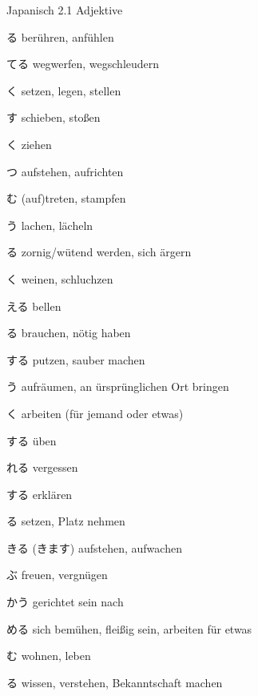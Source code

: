 \begin{multicols*}{2}
\begin{flushleft}
\begin{labeling}{Japanisch 2.1 Adjektive}
	\item [\ruby{触}{さわ}る] berühren, anfühlen
	
	\item [\ruby{捨}{す}てる] wegwerfen, wegschleudern
	\item [\ruby{置}{お}く] setzen, legen, stellen
	\item [\ruby{押}{お}す] schieben, stoßen
	\item [\ruby{引}{ひ}く] ziehen
	\item [\ruby{立}{た}つ] aufstehen, aufrichten
	\item [\ruby{踏}{ふ}む] (auf)treten, stampfen
	\item [\ruby{笑}{わら}う] lachen, lächeln
	\item [\ruby{怒}{おこ}る] zornig/wütend werden, sich ärgern
	\item [\ruby{泣}{な}く] weinen, schluchzen
	
	\item [\ruby{吠}{ほ}える] bellen
	\item [\ruby{要}{い}る] brauchen, nötig haben
	
	\item [\ruby{掃除}{ぞうじ}する] putzen, sauber machen
	
	\item [\ruby{仕舞う}{しま}う] aufräumen, an ürsprünglichen Ort bringen
	\item [\ruby{働く}{はたら}く] arbeiten (für jemand oder etwas)
	\item [\ruby{練習}{れんしゅう}する] üben
	\item [\ruby{忘}{わす}れる] vergessen
	\item [\ruby{説明}{せつめい}する] erklären
	\item [\ruby{座る}{すわ}る] setzen, Platz nehmen
	\item [\ruby{起}{お}きる (\ruby{起}{お}きます)] aufstehen, aufwachen
	
	\item [\ruby{喜}{よろこ}ぶ] freuen, vergnügen
	
	\item [\ruby{向}{む}かう] gerichtet sein nach
	\item [\ruby{努}{つと}める] sich bemühen, fleißig sein, arbeiten für etwas
	\item [\ruby{住}{す}む] wohnen, leben
	\item [\ruby{知}{し}る] wissen, verstehen, Bekanntschaft machen
	

\end{labeling}
\end{flushleft}
\end{multicols*}
